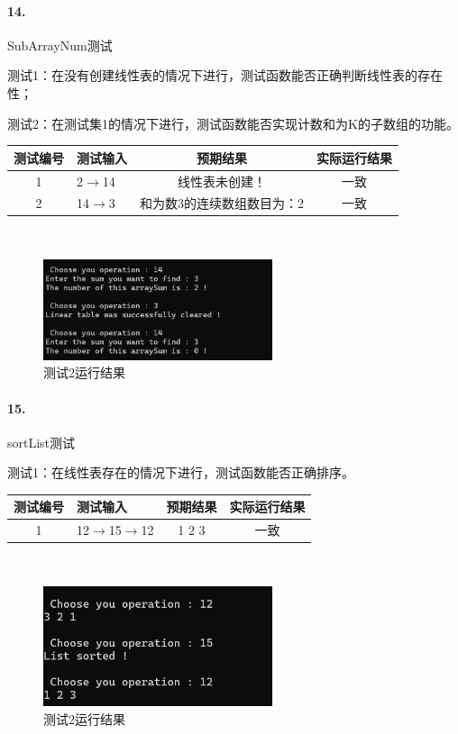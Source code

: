 \documentclass[supercite]{Experimental_Report}
\theoremstyle{definition}
\begin{document}
\paragraph{14.}SubArrayNum测试
	
测试1：在没有创建线性表的情况下进行，测试函数能否正确判断线性表的存在性；

测试2：在测试集1的情况下进行，测试函数能否实现计数和为K的子数组的功能。

\vspace{0.5em}

\begin{tabular}{|c|p{2.7cm}|c|c|}
	\hline
	测试编号 & 测试输入 & 预期结果 & 实际运行结果 \\
	\hline
	1 & 2$\rightarrow$14 & 线性表未创建！ & 一致 \\
	\hline
	2 & 14$\rightarrow$3 & 和为数3的连续数组数目为：2 & 一致 \\
	\hline
\end{tabular}

~\

 \begin{figure}[H]
 	\centering
 	\includegraphics[width=0.6\textwidth]{images/线性表测试14.png}
 	\caption{测试2运行结果}
 	\label{txlab}
 \end{figure}

\paragraph{15.}sortList测试

测试1：在线性表存在的情况下进行，测试函数能否正确排序。

\vspace{0.5em}

\begin{tabular}{|c|p{2.7cm}|c|c|}
	\hline
	测试编号 & 测试输入 & 预期结果 & 实际运行结果 \\
	\hline
	1 & 12$\rightarrow$15$\rightarrow$12 & 1 2 3 & 一致 \\
	\hline
\end{tabular}

~\

 \begin{figure}[H]
 	\centering
 	\includegraphics[width=0.6\textwidth]{images/线性表测试15.png}
 	\caption{测试2运行结果}
 	\label{txlab}
 \end{figure}
\end{document}
